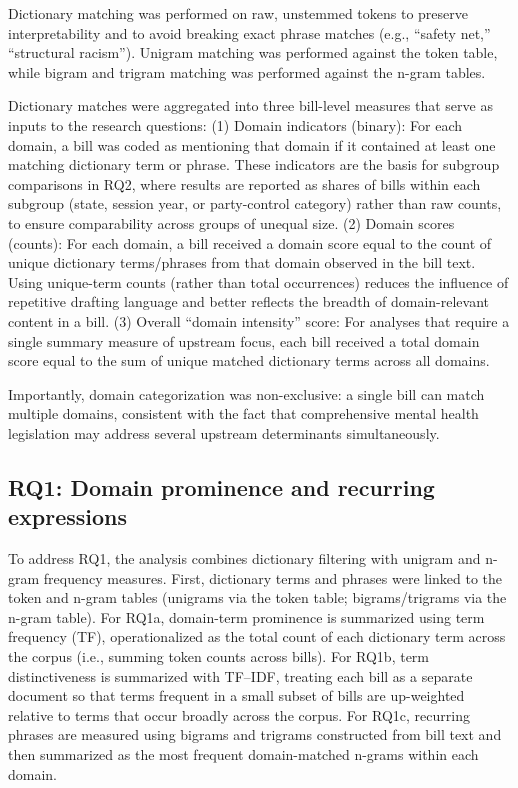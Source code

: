 \documentclass[10pt,twocolumn]{article}
\begin{document}
Dictionary matching was performed on raw, unstemmed tokens to preserve
interpretability and to avoid breaking exact phrase matches (e.g.,
``safety net,'' ``structural racism''). Unigram matching was performed
against the token table, while bigram and trigram matching was performed
against the n-gram tables.

Dictionary matches were aggregated into three bill-level measures that
serve as inputs to the research questions: (1) Domain indicators
(binary): For each domain, a bill was coded as mentioning that domain if
it contained at least one matching dictionary term or phrase. These
indicators are the basis for subgroup comparisons in RQ2, where results
are reported as shares of bills within each subgroup (state, session
year, or party-control category) rather than raw counts, to ensure
comparability across groups of unequal size. (2) Domain scores (counts):
For each domain, a bill received a domain score equal to the count of
unique dictionary terms/phrases from that domain observed in the bill
text. Using unique-term counts (rather than total occurrences) reduces
the influence of repetitive drafting language and better reflects the
breadth of domain-relevant content in a bill. (3) Overall ``domain
intensity'' score: For analyses that require a single summary measure of
upstream focus, each bill received a total domain score equal to the sum
of unique matched dictionary terms across all domains.

Importantly, domain categorization was non-exclusive: a single bill can
match multiple domains, consistent with the fact that comprehensive
mental health legislation may address several upstream determinants
simultaneously.

\subsection{RQ1: Domain prominence and recurring
expressions}\label{rq1-domain-prominence-and-recurring-expressions}

To address RQ1, the analysis combines dictionary filtering with unigram
and n-gram frequency measures. First, dictionary terms and phrases were
linked to the token and n-gram tables (unigrams via the token table;
bigrams/trigrams via the n-gram table). For RQ1a, domain-term prominence
is summarized using term frequency (TF), operationalized as the total
count of each dictionary term across the corpus (i.e., summing token
counts across bills). For RQ1b, term distinctiveness is summarized with
TF--IDF, treating each bill as a separate document so that terms
frequent in a small subset of bills are up-weighted relative to terms
that occur broadly across the corpus. For RQ1c, recurring phrases are
measured using bigrams and trigrams constructed from bill text and then
summarized as the most frequent domain-matched n-grams within each
domain.
\end{document}
